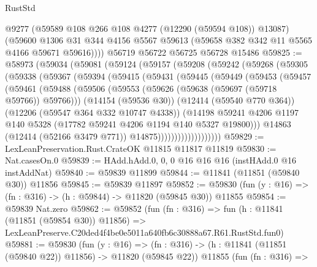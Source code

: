 \begin{lexlean}{RustStd}
\begin{coremodule}
        @9277
        (@59589 @108 @266 @108 @4277 (@12290 (@59594 @108)) @13087)
        (@59600
          @1306
          @31
          @344
          @4156
          @5567
          @59613
          (@59658 @382 @342 @11 @5565 @4166 @59671 @59616))))
    @56719
    @56722
    @56725
    @56728
    @15486
@59825 := @58973
    (@59034
      (@59081
        (@59124
          (@59157
            (@59208
              (@59242
                (@59268
                  (@59305
                    (@59338
                      (@59367
                        (@59394
                          (@59415
                            (@59431
                              (@59445
                                (@59449
                                  (@59453
                                    (@59457
                                      (@59461
                                        (@59488
                                          (@59506
                                            (@59553
                                              (@59626 (@59638 (@59697 (@59718 @59766)) @59766)))
                                            (@14154 (@59536 @30))
                                            (@12414 (@59540 @770 @364))
                                            (@12206 (@59547 @364 @332 @10747 @4338))
                                            (@14198
                                              @59241
                                              @4206
                                              @1197
                                              @140
                                              @5328
                                              (@17782 @59241 @4206 @1194 @140 @5327 @19800)))
                                          @14863
                                          (@12414 (@52166 @3479 @771))
                                          @14875)))))))))))))))))))
@59829 := LexLeanPreservation.Rust.CrateOK @11815 @11817 @11819
@59830 := Nat.casesOn.{0}
@59839 := HAdd.hAdd.{0, 0, 0} @16 @16 @16 (instHAdd.{0} @16 instAddNat)
@59840 := @59839 @11899
@59844 := @11841 (@11851 (@59840 @30)) @11856
@59845 := @59839 @11897
@59852 := @59830 (fun (y : @16) => (fn : @316) -> (h : @59844) -> @11820 (@59845 @30)) @11855
@59854 := @59839 Nat.zero
@59862 := @59852
    (fun (fn : @316) =>
    fun (h : @11841 (@11851 (@59854 @30)) @11856) =>
    LexLeanPreserve.C20ded4f4be0e5011a640fb6c30888a67.R61.RustStd.fun0)
@59881 := @59830
    (fun (y : @16) =>
    (fn : @316) -> (h : @11841 (@11851 (@59840 @22)) @11856) -> @11820 (@59845 @22))
    @11855
    (fun (fn : @316) =>

\end{coremodule}
\end{lexlean}
